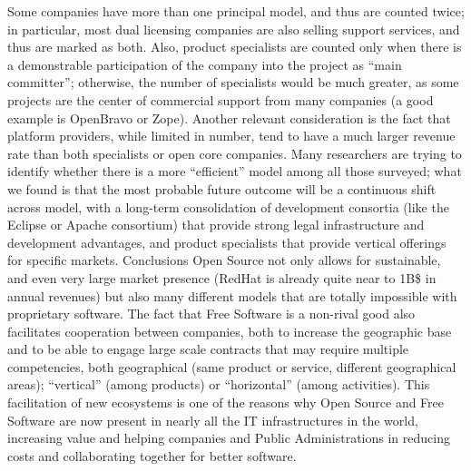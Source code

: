 Some companies have more than one principal model, and thus are counted twice; in particular, most dual licensing companies are also selling support services, and thus are marked as both. Also, product specialists are counted only when there is a demonstrable participation of the company into the project as “main committer”; otherwise, the number of specialists would be much greater, as some projects are the center of commercial support from many companies (a good example is OpenBravo or Zope).
Another relevant consideration is the fact that platform providers, while limited in number, tend to have a much larger revenue rate than both specialists or open core companies. Many researchers are trying to identify whether there is a more “efficient” model among all those surveyed; what we found is that the most probable future outcome will be a continuous shift across model, with a long-term consolidation of development consortia (like the Eclipse or Apache consortium) that provide strong legal infrastructure and development advantages, and product specialists that provide vertical offerings for specific markets. 
Conclusions
Open Source not only allows for sustainable, and even very large market presence (RedHat is already quite near to 1B\$ in annual revenues) but also many different models that are totally impossible with proprietary software. The fact that Free Software is a non-rival good also facilitates cooperation between companies, both to increase the geographic base and to be able to engage large scale contracts that may require multiple competencies, both geographical (same product or service, different geographical areas); “vertical” (among products) or “horizontal” (among activities). This facilitation of new ecosystems is one of the reasons why Open Source and Free Software are now present in nearly all the IT infrastructures in the world, increasing value and helping companies and Public Administrations in reducing costs and collaborating together for better software.

